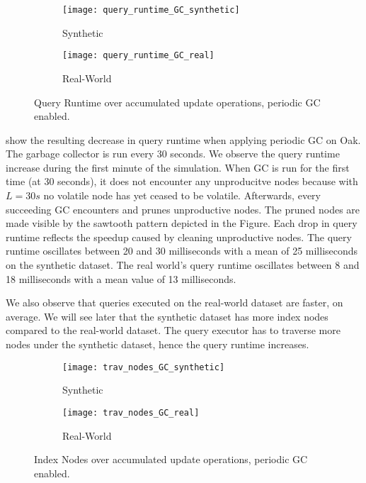 \documentclass[abstracton,12pt]{scrartcl}
\theoremstyle{definition}
\begin{document}
\begin{figure}[h]
  \centering
  \begin{subfigure}{0.49\linewidth}
    \centering
    \caption{Synthetic}
    \texttt{[image: query\_runtime\_GC\_synthetic]}
    \label{fig:query_runtime_GC_synthetic}
  \end{subfigure}
  \begin{subfigure}{0.49\linewidth}
    \centering
    \caption{Real-World}
    \texttt{[image: query\_runtime\_GC\_real]}
    \label{fig:query_runtime_GC_real}
  \end{subfigure}
  \vspace{-0.8cm}
  \caption[Query Runtime over accumulated update operations, periodic GC enabled]{
  Query Runtime over accumulated update operations, periodic GC enabled.}
\end{figure}

 show the
resulting decrease in query runtime when applying periodic GC on Oak. The
garbage collector is run every 30 seconds. We observe the query runtime
increase during the first minute of the simulation. 
When GC is run for the first time (at 30 seconds), it does not encounter
any unproducitve nodes because with $L=30s$ no volatile node has yet
ceased to be volatile. Afterwards, every succeeding GC encounters
and prunes unproductive nodes. The pruned nodes are made visible by the
sawtooth pattern depicted in the Figure. 
Each drop in query runtime reflects the speedup caused by cleaning unproductive
nodes. The query runtime oscillates between
20 and 30 milliseconds with a mean of 25 milliseconds on the synthetic dataset.
The real world's query runtime oscillates between 8 and 18 milliseconds with a mean
value of 13 milliseconds.

We also observe that queries executed on the real-world dataset are faster,
on average. We will see later that the synthetic dataset has more index
nodes compared to the real-world dataset. The query executor has to traverse
more nodes under the synthetic dataset, hence the query runtime increases.

\begin{figure}[ht]
  \centering
  \begin{subfigure}{0.49\linewidth}
    \centering
    \caption{Synthetic}
    \texttt{[image: trav\_nodes\_GC\_synthetic]}
    \label{fig:trav_nodes_GC_synthetic}
  \end{subfigure}
  \begin{subfigure}{0.49\linewidth}
    \centering
    \caption{Real-World}
    \texttt{[image: trav\_nodes\_GC\_real]}
    \label{fig:trav_nodes_GC_real}
  \end{subfigure}
  \vspace{-0.8cm}
  \caption[Index Nodes over accumulated update operations, periodic GC enabled]{
  Index Nodes over accumulated update operations, periodic GC enabled.}
\end{figure}
\end{document}
